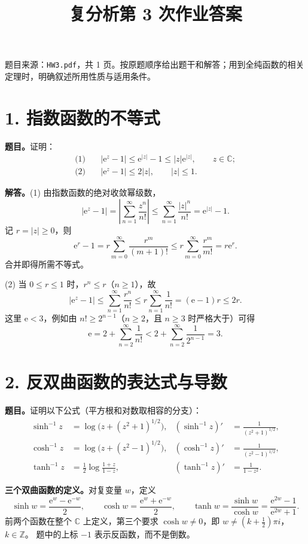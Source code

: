 \documentclass[11pt,a4paper]{ctexart}
\title{复分析第 3 次作业答案}
\author{}\date{}
\newcommand{\C}{\mathbb C}
\newcommand{\e}{\mathrm e}
\begin{document}
\maketitle
\vspace{-2em}
题目来源：\texttt{HW3.pdf}，共 1 页。按原题顺序给出题干和解答；用到全纯函数的相关定理时，明确叙述所用性质与适用条件。

\section*{1. 指数函数的不等式}
\textbf{题目。}证明：
\begin{align*}
\text{(1)}\quad &|\e^z-1|\le \e^{|z|}-1\le |z|\e^{|z|},\qquad z\in\C;\\
\text{(2)}\quad &|\e^z-1|\le 2|z|,\qquad |z|\le 1.
\end{align*}

\textbf{解答。}(1) 由指数函数的绝对收敛幂级数，
\[
|\e^z-1|=\left|\sum_{n=1}^\infty\frac{z^n}{n!}\right|
\le\sum_{n=1}^\infty\frac{|z|^n}{n!}=\e^{|z|}-1.
\]
记 $r=|z|\ge0$，则
\[
\e^r-1=r\sum_{m=0}^\infty\frac{r^m}{(m+1)!}
\le r\sum_{m=0}^\infty\frac{r^m}{m!}=r\e^r.
\]
合并即得所需不等式。

(2) 当 $0\le r\le1$ 时，$r^n\le r$（$n\ge1$），故
\[
|\e^z-1|\le\sum_{n=1}^\infty\frac{r^n}{n!}
\le r\sum_{n=1}^\infty\frac1{n!}=(\e-1)r\le2r.
\]
这里 $\e<3$，例如由 $n!\ge2^{n-1}$（$n\ge2$，且 $n\ge3$ 时严格大于）可得
\[
\e=2+\sum_{n=2}^\infty\frac1{n!}<2+\sum_{n=2}^\infty\frac1{2^{n-1}}=3.
\]

\newpage
\section*{2. 反双曲函数的表达式与导数}
\textbf{题目。}证明以下公式（平方根和对数取相容的分支）：
\begin{align*}
\sinh^{-1}z&=\log\bigl(z+(z^2+1)^{1/2}\bigr),&
(\sinh^{-1}z)'&=\frac1{(z^2+1)^{1/2}},\\
\cosh^{-1}z&=\log\bigl(z+(z^2-1)^{1/2}\bigr),&
(\cosh^{-1}z)'&=\frac1{(z^2-1)^{1/2}},\\
\tanh^{-1}z&=\frac12\log\frac{1+z}{1-z},&
(\tanh^{-1}z)'&=\frac1{1-z^2}.
\end{align*}

\textbf{三个双曲函数的定义。}对复变量 $w$，定义
\[
\boxed{\sinh w=\frac{\e^w-\e^{-w}}2,\qquad
\cosh w=\frac{\e^w+\e^{-w}}2,\qquad
\tanh w=\frac{\sinh w}{\cosh w}
=\frac{\e^{2w}-1}{\e^{2w}+1}.}
\]
前两个函数在整个 $\C$ 上定义，第三个要求 $\cosh w\ne0$，即
$w\ne (k+\tfrac12)\pi i$，$k\in\mathbb Z$。
题中的上标 $-1$ 表示反函数，而不是倒数。
\end{document}
